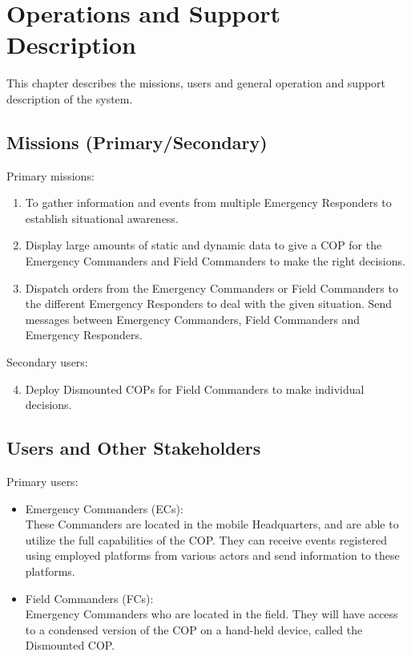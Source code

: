\chapter{Operations and Support Description}
\label{chp_operations}
This chapter describes the missions, users and general operation and support description of the system.

\section{Missions (Primary/Secondary)}
Primary missions:
\begin{enumerate}
	\item To gather information and events from multiple Emergency Responders to establish situational awareness.
	\item Display large amounts of static and dynamic data to give a COP for the Emergency Commanders and Field Commanders to make the right decisions.
	\item Dispatch orders from the Emergency Commanders or Field Commanders to the different Emergency Responders to deal with the given situation. Send messages between Emergency Commanders, Field Commanders and Emergency Responders.
\end{enumerate}

\noindent Secondary users:
\begin{enumerate}
	\setcounter{enumi}{3}
	\item Deploy Dismounted COPs for Field Commanders to make individual decisions.
\end{enumerate}

\section{Users and Other Stakeholders}
\noindent Primary users:
\begin{itemize}
	\item Emergency Commanders (ECs): \\
	These Commanders are located in the mobile Headquarters, and are able to utilize the full capabilities of the COP. They can receive events registered using employed platforms from various actors and send information to these platforms.
	\item Field Commanders (FCs):\\
	Emergency Commanders who are located in the field. They will have access to a condensed version of the COP on a hand-held device, called the Dismounted COP.
\end{itemize}
	
